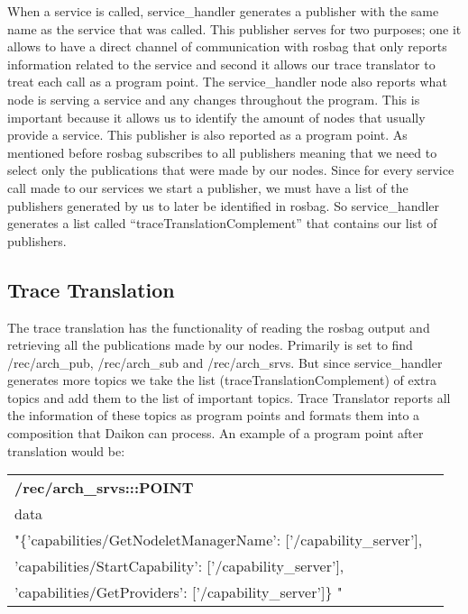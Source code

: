 \documentclass[10pt, conference]{IEEEtran}
\begin{document}
When a service is called, service\_handler generates a publisher with the same name as the service that was called. This publisher serves for two purposes; one it allows to have a direct channel of communication with rosbag that only reports information related to the service and second it allows our trace translator to treat each call as a program point. 
\indent The service\_handler node also reports what node is serving a service and any changes throughout the program. This is important because it allows us to identify the amount of nodes that usually provide a service.  This publisher is also reported as a program point. 
\newline  \indent As mentioned before rosbag subscribes to all publishers meaning that we need to select only the publications that were made by our nodes. Since for every service call made to our services we start a publisher, we must have a list of the publishers generated by us to later be identified in rosbag. So service\_handler generates a list called “traceTranslationComplement” that contains our list of publishers.     
\subsection{Trace Translation}
The trace translation has the functionality of reading the rosbag output and retrieving all the publications made by our nodes. Primarily is set to find /rec/arch\_pub, /rec/arch\_sub and /rec/arch\_srvs. But since service\_handler generates more topics we take the list (traceTranslationComplement) of extra topics and add them to the list of important topics. 
	Trace Translator reports all the information of these topics as program points and formats them into a composition that Daikon can process. An example of a program point after translation would be: 

\begin{table}[h!]
 \begin{tabular}{ l c} 
\textbf{/rec/arch\_srvs:::POINT}\\
data \\
"\{'capabilities/GetNodeletManagerName': ['/capability\_server'], \\
'capabilities/StartCapability': ['/capability\_server'],\\
 'capabilities/GetProviders': ['/capability\_server']\} "  \\ [1ex] 
 \end{tabular}
\end{table}
\end{document}
